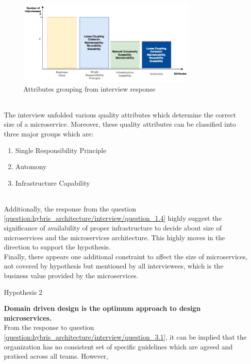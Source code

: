 \\
\begin{figure}[H]
\begin{center}
\includegraphics[width=0.8\textwidth]{figures/hybris-architecture-two}
\caption{Attributes grouping from interview response}
\label{fig:hybris_architecture/interview/attributes_grouping}
\end{center}
\end{figure}
\\
The interview unfolded various quality attributes which determine the correct size of a microservice. Moreover, these quality attributes can be classified into three major groups which are: \\
\begin{enumerate}
\item Single Responsibility Principle
\item Automony
\item Infrastructure Capability
\end{enumerate}
\\
Additionally, the response from the question \ref{question:hybris_architecture/interview/question_1.4} highly suggest the significance of availability of proper infrastructure to decide about size of microservices and the microservices architecture.
This highly moves in the direction to support the hypothesis.\\
Finally, there appears one additional constraint to affect the size of microservices, not covered by hypothesis but mentioned by all interviewees, which is the business value provided by the microservices.
\\
\begin{shaded} Hypothesis 2 \end{shaded}
\textbf{Domain driven design is the optimum approach to design microservices.}
\\
From the response to question \ref{question:hybris_architecture/interview/question_3.1}, it can be implied that the organization has no consistent set of specific guidelines which are agreed and pratised across all teams. However,  
